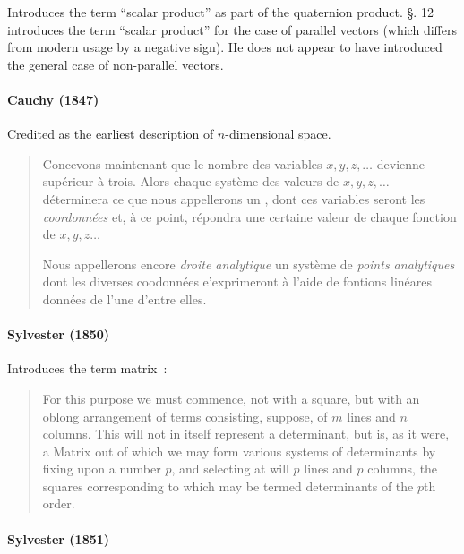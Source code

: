Introduces the term ``scalar product'' as part of the quaternion product.
\S. 12 introduces the term ``scalar product'' for the case of parallel vectors (which differs from modern usage by a negative sign).
He does not appear to have introduced the general case of non-parallel vectors.

\paragraph{Cauchy (1847)~\cite{Cauchy1847}}

Credited  as the earliest description of $n$-dimensional space.

\begin{quote}
Concevons maintenant que le nombre des variables $x, y, z, \dots$
devienne sup\'erieur \`a trois. Alors chaque syst\`eme des valeurs de
$x, y, z, \dots$ d\'eterminera ce que nous appellerons un , dont
ces variables seront les \textit{coordonn\'ees} et, \`a ce point, r\'epondra une
certaine valeur de chaque fonction de $x, y, z \dots$

Nous appellerons encore \textit{droite analytique} un syst\`eme de \textit{points
analytiques} dont les diverses coodonn\'ees e'exprimeront \`a l'aide de
fontions lin\'eares donn\'ees de l'une d'entre elles.
\end{quote}

\paragraph{Sylvester (1850)~\cite{Sylvester1850}}

Introduces the term matrix~\cite[p. 150]{Sylvester1850}:

\begin{quote}
For this purpose we must commence, not
with a square, but with an oblong arrangement of terms consisting, suppose,
of $m$ lines and $n$ columns. This will not in itself represent a determinant,
but is, as it were, a Matrix out of which we may form various systems of
determinants by fixing upon a number $p$, and selecting at will $p$ lines and $p$
columns, the squares corresponding to which may be termed determinants
of the $p$th order.
\end{quote}

\paragraph{Sylvester (1851)~\cite{Sylvester1851}}


